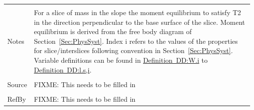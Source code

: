 \documentclass[12pt]{article}
\begin{document}
\begin{minipage}{\textwidth}
\begin{tabular}{p{} p{}}
\\ \midrule \\
Notes & For a slice of mass in the slope the moment equilibrium to satisfy T2 in the direction perpendicular to the base surface of the slice. Moment equilibrium is derived from the free body diagram of Section~\ref{Sec:PhysSyst}. Index i refers to the values of the properties for slice/interslices following convention in Section~\ref{Sec:PhysSyst}. Variable definitions can be found in \hyperref[DD:W.i]{Definition~DD:W.i} to \hyperref[DD:l.s,i]{Definition~DD:l.s,i}.
\\ \midrule \\
Source & FIXME: This needs to be filled in
\\ \midrule \\
RefBy & FIXME: This needs to be filled in
\\ \bottomrule \end{tabular}
\end{minipage}\\
~\newline
\end{document}

